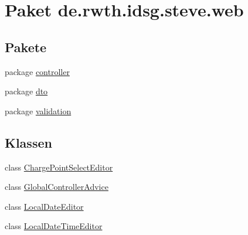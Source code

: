 \hypertarget{namespacede_1_1rwth_1_1idsg_1_1steve_1_1web}{\section{Paket de.\-rwth.\-idsg.\-steve.\-web}
\label{namespacede_1_1rwth_1_1idsg_1_1steve_1_1web}
}
\subsection*{Pakete}
\begin{DoxyCompactItemize}
\item 
package \hyperlink{namespacede_1_1rwth_1_1idsg_1_1steve_1_1web_1_1controller}{controller}
\item 
package \hyperlink{namespacede_1_1rwth_1_1idsg_1_1steve_1_1web_1_1dto}{dto}
\item 
package \hyperlink{namespacede_1_1rwth_1_1idsg_1_1steve_1_1web_1_1validation}{validation}
\end{DoxyCompactItemize}
\subsection*{Klassen}
\begin{DoxyCompactItemize}
\item 
class \hyperlink{classde_1_1rwth_1_1idsg_1_1steve_1_1web_1_1_charge_point_select_editor}{Charge\-Point\-Select\-Editor}
\item 
class \hyperlink{classde_1_1rwth_1_1idsg_1_1steve_1_1web_1_1_global_controller_advice}{Global\-Controller\-Advice}
\item 
class \hyperlink{classde_1_1rwth_1_1idsg_1_1steve_1_1web_1_1_local_date_editor}{Local\-Date\-Editor}
\item 
class \hyperlink{classde_1_1rwth_1_1idsg_1_1steve_1_1web_1_1_local_date_time_editor}{Local\-Date\-Time\-Editor}
\end{DoxyCompactItemize}
